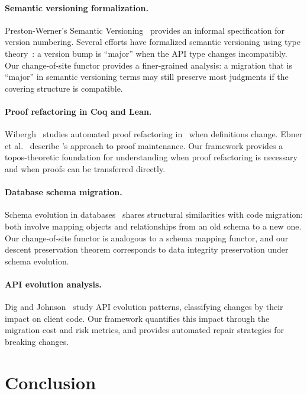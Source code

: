 \documentclass[11pt]{article}
\begin{document}
\paragraph{Semantic versioning formalization.}
Preston-Werner's Semantic Versioning~\cite{SemVer2013} provides an informal
specification for version numbering.  Several efforts have formalized
semantic versioning using type theory~\cite{Dietrich2019}: a version bump
is ``major'' when the API type changes incompatibly.  Our change-of-site
functor provides a finer-grained analysis: a migration that is
``major'' in semantic versioning terms may still preserve most judgments
if the covering structure is compatible.

\paragraph{Proof refactoring in Coq and Lean.}
Wibergh~\cite{Wibergh2019} studies automated proof refactoring in \Coq\
when definitions change.  Ebner et al.~\cite{Lean4} describe \LEAN's
approach to proof maintenance.  Our framework provides a topos-theoretic
foundation for understanding when proof refactoring is
necessary and when proofs can be transferred directly.

\paragraph{Database schema migration.}
Schema evolution in databases~\cite{Curino2008} shares structural
similarities with code migration: both involve mapping objects and
relationships from an old schema to a new one.  Our change-of-site functor
is analogous to a schema mapping functor, and our descent preservation
theorem corresponds to data integrity preservation under schema evolution.

\paragraph{API evolution analysis.}
Dig and Johnson~\cite{Dig2006} study API evolution patterns, classifying
changes by their impact on client code.  Our framework quantifies this
impact through the migration cost and risk metrics, and provides automated
repair strategies for breaking changes.

\section{Conclusion}\label{sec:conclusion}
\end{document}
